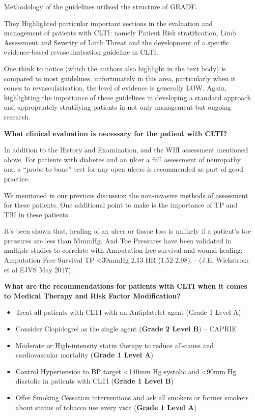 \documentclass[
]{book}
\begin{document}
Methodology of the guidelines utilised the structure of GRADE.

They Highlighted particular important sections in the evaluation and
management of patients with CLTI: namely Patient Risk stratification,
Limb Assessment and Severity of Limb Threat and the development of a
specific evidence-based revascularisation guideline in CLTI.

One think to notice (which the authors also highlight in the text body)
is compared to most guidelines, unfortunately in this area, particularly
when it comes to revascularisation, the level of evidence is generally
LOW. Again, highlighting the importance of these guidelines in
developing a standard approach and appropriately stratifying patients in
not only management but ongoing research.

\textbf{What clinical evaluation is necessary for the patient with CLTI?}

In addition to the History and Examination, and the WIfI assessment
mentioned above. For patients with diabetes and an ulcer a full
assessment of neuropathy and a ``probe to bone'' test for any open ulcers
is recommended as part of good practice.

We mentioned in our previous discussion the non-invasive methods of
assessment for these patients. One additional point to make is the
importance of TP and TBI in these patients.

It's been shown that, healing of an ulcer or tissue loss is unlikely if
a patient's toe pressures are less than 55mmHg. And Toe Pressures have
been validated in multiple studies to correlate with Amputation free
survival and wound healing: Amputation Free Survival TP \textless30mmHg 2.13 HR
(1.52-2.98). - (J.E. Wickstrom et al EJVS May 2017).

\textbf{What are the recommendations for patients with CLTI when it comes to
Medical Therapy and Risk Factor Modification?}

\begin{itemize}
\item
  Treat all patients with CLTI with an Antiplatelet agent (Grade 1
  Level A)
\item
  Consider Clopidogrel as the single agent (\textbf{Grade 2 Level B}) --
  CAPRIE
\item
  Moderate or High-intensity statin therapy to reduce all-cause and
  cardiovascular mortality (\textbf{Grade 1 Level A})
\item
  Control Hypertension to BP target \textless140mm Hg systolic and \textless90mm Hg
  diastolic in patients with CLTI (\textbf{Grade 1 Level B})
\item
  Offer Smoking Cessation interventions and ask all smokers or former
  smokers about status of tobacco use every visit (\textbf{Grade 1 Level
  A})
\end{itemize}
\end{document}
